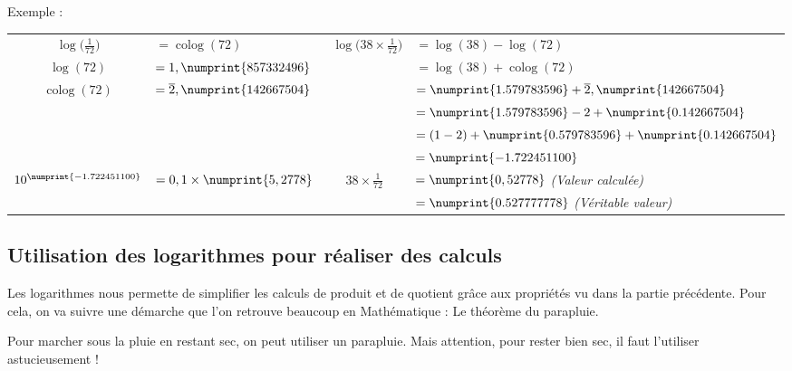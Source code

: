 \documentclass[a4paper, twoside]{article}
\begin{document}
	\vspace{2 mm}

	{ \parindent=0cm Exemple : }

	\begin{tabular}{cl|cl}
		$\log \Big( \frac{1}{72} \Big) $ & $= \operatorname{colog} (72)$ & $~~\log \Big(38 \times \frac{1}{72} \Big)$ & $= \log(38) - \log(72)$\\
		
	$ \log (72) $ & $= 1,\numprint{857 332 496}$ & & $= \log(38) + \operatorname{colog}(72)$ \\

	$ \operatorname{colog} (72) $ & $= \overline{2},\numprint{142 667 504} $ & & $= \numprint{1.579 783 596} + \overline{2},\numprint{142 667 504}$\\

	& & & $= \numprint{1.579 783 596} -2 + \numprint{0.142 667 504}$\\

	& & & $= (1-2) + \numprint{0.579 783 596} + \numprint{0.142 667 504}$\\

	&&& $= \numprint{-1.722451100}$\\

	$10^{\numprint{-1.722451100}}$ & $= 0,1 \times \numprint{5,2778}$ & $38 \times \frac{1}{72}$ & $= \numprint{0,52778}$\phantom{$\numprint{7777}$} \textit{(Valeur calculée)}\\

	&&& $= \numprint{0.527 777 778}$ \textit{(Véritable valeur)}\\

	\end{tabular}





	\newpage

	\subsection{Utilisation des logarithmes pour réaliser des calculs}

	Les logarithmes nous permette de simplifier les calculs de produit et de quotient grâce aux propriétés vu dans la partie précédente. Pour cela, on va suivre une démarche que l'on retrouve beaucoup en Mathématique : Le théorème du parapluie.

	Pour marcher sous la pluie en restant sec, on peut utiliser un parapluie. Mais attention, pour rester bien sec, il faut l'utiliser astucieusement !
\end{document}
